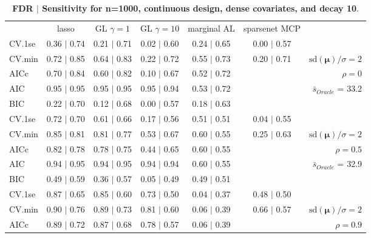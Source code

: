 \clearpage
\begin{table}\vspace{-.5cm}
\caption[l]{ {\it }
{ \bf FDR $\boldsymbol{\mid}$ Sensitivity for n=1000, continuous design, dense covariates, and  decay  10}.}
\vspace{-.5cm}
\footnotesize{}
\begin{center}
\begin{tabular}{l*{5}{c}|r}
 & lasso & GL $\gamma=1$ & GL $\gamma=10$ & marginal AL & sparsenet MCP  & \\
 \cline{1-7}
CV.1se & 0.36 $\mid$ 0.74 & 0.21 $\mid$ 0.71 & 0.02 $\mid$ 0.60 & 0.24 $\mid$ 0.65 & 0.00 $\mid$ 0.57 & \\
CV.min & 0.72 $\mid$ 0.85 & 0.64 $\mid$ 0.83 & 0.22 $\mid$ 0.72 & 0.55 $\mid$ 0.73 & 0.20 $\mid$ 0.71 &  $\mathrm{sd}(\mathbf{\mu})/\sigma=2$ \\
AICc & 0.70 $\mid$ 0.84 & 0.60 $\mid$ 0.82 & 0.10 $\mid$ 0.67 & 0.52 $\mid$ 0.72 & & $\rho=0$ \\
AIC & 0.95 $\mid$ 0.95 & 0.95 $\mid$ 0.95 & 0.95 $\mid$ 0.94 & 0.53 $\mid$ 0.72 & &  \multirow{2}{*}{$\bar{s}_{Oracle}$ = 33.2} \\
BIC & 0.22 $\mid$ 0.70 & 0.12 $\mid$ 0.68 & 0.00 $\mid$ 0.57 & 0.18 $\mid$ 0.63 & &  \\
 \hline 
CV.1se & 0.72 $\mid$ 0.70 & 0.61 $\mid$ 0.66 & 0.17 $\mid$ 0.56 & 0.51 $\mid$ 0.51 & 0.04 $\mid$ 0.55 & \\
CV.min & 0.85 $\mid$ 0.81 & 0.81 $\mid$ 0.77 & 0.53 $\mid$ 0.67 & 0.60 $\mid$ 0.55 & 0.25 $\mid$ 0.63 &  $\mathrm{sd}(\mathbf{\mu})/\sigma=2$ \\
AICc & 0.82 $\mid$ 0.78 & 0.78 $\mid$ 0.75 & 0.44 $\mid$ 0.65 & 0.60 $\mid$ 0.55 & & $\rho=0.5$ \\
AIC & 0.94 $\mid$ 0.95 & 0.94 $\mid$ 0.95 & 0.94 $\mid$ 0.94 & 0.60 $\mid$ 0.55 & &  \multirow{2}{*}{$\bar{s}_{Oracle}$ = 32.9} \\
BIC & 0.49 $\mid$ 0.59 & 0.36 $\mid$ 0.57 & 0.05 $\mid$ 0.49 & 0.49 $\mid$ 0.51 & &  \\
 \hline 
CV.1se & 0.87 $\mid$ 0.65 & 0.85 $\mid$ 0.60 & 0.73 $\mid$ 0.50 & 0.04 $\mid$ 0.37 & 0.48 $\mid$ 0.50 & \\
CV.min & 0.90 $\mid$ 0.76 & 0.89 $\mid$ 0.73 & 0.81 $\mid$ 0.60 & 0.06 $\mid$ 0.39 & 0.66 $\mid$ 0.57 &  $\mathrm{sd}(\mathbf{\mu})/\sigma=2$ \\
AICc & 0.89 $\mid$ 0.72 & 0.87 $\mid$ 0.68 & 0.78 $\mid$ 0.57 & 0.06 $\mid$ 0.39 & & $\rho=0.9$ \\

\end{tabular}
\end{center}
\end{table}
